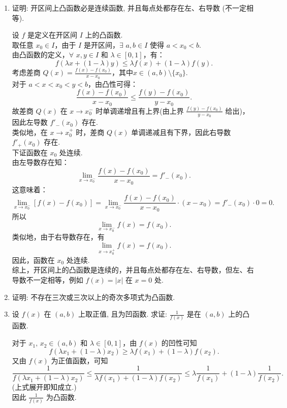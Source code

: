 \begin{enumerate}
    \item[1.]证明: 开区间上凸函数必是连续函数, 并且每点处都存在左、右导数 (不一定相等).
    \begin{solution}
        设 \( f \) 是定义在开区间 \( I \) 上的凸函数.\\
        取任意 \( x_0 \in I \)，由于 \( I \) 是开区间，$\exists$ \( a, b \in I \) 使得 \( a < x_0 < b \).\\
        由凸函数的定义，$\forall$ \( x, y \in I \) 和 \( \lambda \in [0,1] \)，有：
        \[
        f(\lambda x + (1-\lambda) y) \leq \lambda f(x) + (1-\lambda) f(y).
        \]
        考虑差商 \( \displaystyle Q(x) = \frac{f(x) - f(x_0)}{x - x_0} \)，其中\( x \in (a, b) \setminus \{x_0\} \).\\
        对于 \( a < x < x_0 < y < b \)，由凸性可得：
        \[
        \frac{f(x) - f(x_0)}{x - x_0} \leq \frac{f(y) - f(x_0)}{y - x_0}.
        \]
        故差商 \( Q(x) \) 在 \( x \to x_0^- \) 时单调递增且有上界(由上界 \(\displaystyle \frac{f(y) - f(x_0)}{y - x_0} \) 给出)，因此左导数 \( f'_-(x_0) \) 存在.\\
        类似地，在 \( x \to x_0^+ \) 时，差商 \( Q(x) \) 单调递减且有下界，因此右导数 \( f'_+(x_0) \) 存在.\\  
        下证函数在 \( x_0 \) 处连续.\\
        由左导数存在知：
        \[
        \lim_{x \to x_0^-} \frac{f(x) - f(x_0)}{x - x_0} = f'_-(x_0).
        \]
        这意味着：
        \[
        \lim_{x \to x_0^-} [f(x) - f(x_0)] = \lim_{x \to x_0^-} \frac{f(x) - f(x_0)}{x - x_0} \cdot (x - x_0) = f'_-(x_0) \cdot 0 = 0.
        \]
        所以 
        \[
        \lim_{x \to x_0^-} f(x) = f(x_0).
        \]
        类似地，由于右导数存在，有
        \[
        \lim_{x \to x_0^+} f(x) = f(x_0).
        \]
        因此，函数在 \( x_0 \) 处连续.\\
        综上，开区间上的凸函数是连续的，并且每点处都存在左、右导数，但左、右导数不一定相等，例如 $f(x)=\left| x \right|$ 在 $x=0$ 处.
    \end{solution}

    \item[2.]证明: 不存在三次或三次以上的奇次多项式为凸函数.
    \item[3.]设 \(f(x)\) 在 \((a,b)\) 上取正值, 且为凹函数. 求证: \(\displaystyle\frac{1}{f(x)}\) 是在 \((a,b)\) 上的凸函数.
    \begin{solution}
        对于 $x_1,\,x_2\in(a,b)$ 和 $\lambda\in[0,1]$，由 $f(x)$ 的凹性可知
        \[
        f(\lambda x_1+(1-\lambda)x_2)\geq \lambda f(x_1)+(1-\lambda)f(x_2).
        \]
        又由 $f(x)$ 为正值函数，可知
        \[
        \frac{1}{f(\lambda x_1+(1-\lambda)x_2)}\leq \frac{1}{\lambda f(x_1)+(1-\lambda)f(x_2)}\leq \lambda\frac{1}{f(x_1)}+(1-\lambda)\frac{1}{f(x_2)}.
        \]
        (上式展开即知成立.)\\
        因此 $\displaystyle\frac{1}{f(x)}$ 为凸函数.
    \end{solution}


\end{enumerate}
